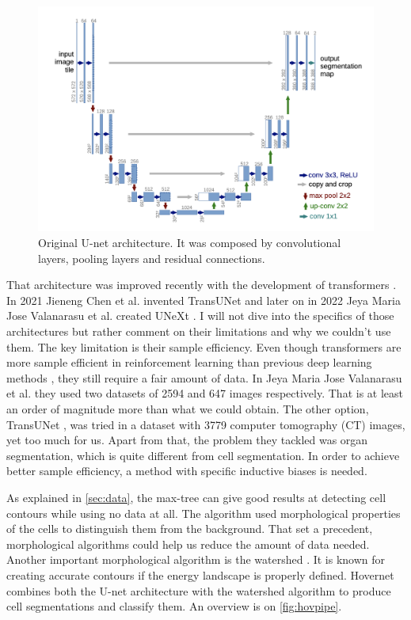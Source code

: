 \begin{figure}[ht]
    \centering
    \includegraphics[width=\textwidth]{imgs/unet.png}
    \caption{Original U-net architecture. It was composed by convolutional layers, pooling layers and residual connections.}
    \label{fig:unet}
\end{figure}

That architecture was improved recently with the development of transformers \cite{transformer}. In 2021 Jieneng Chen et al. invented TransUNet \cite{transunet} and later on in 2022 Jeya Maria Jose Valanarasu et al. created UNeXt \cite{unext}. I will not dive into the specifics of those architectures but rather comment on their limitations and why we couldn't use them. The key limitation is their sample efficiency. Even though transformers are more sample efficient in reinforcement learning than previous deep learning methods \cite{micheli2023transformers}, they still require a fair amount of data. In Jeya Maria Jose Valanarasu et al. \cite{unext} they used two datasets of 2594 and 647 images respectively. That is at least an order of magnitude more than what we could obtain. The other option, TransUNet \cite{transunet}, was tried in a dataset with 3779 computer tomography (CT) images, yet too much for us. Apart from that, the problem they tackled was organ segmentation, which is quite different from cell segmentation. In order to achieve better sample efficiency, a method with specific inductive biases is needed.

As explained in \autoref{sec:data}, the max-tree \cite{maxtree} can give good results at detecting cell contours while using no data at all. The algorithm used morphological properties of the cells to distinguish them from the background. That set a precedent, morphological algorithms could help us reduce the amount of data needed. Another important morphological algorithm is the watershed \cite{watershed}. It is known for creating accurate contours if the energy landscape is properly defined. Hovernet \cite{hovernet} combines both the U-net architecture with the watershed algorithm to produce cell segmentations and classify them. An overview is on \autoref{fig:hovpipe}.

